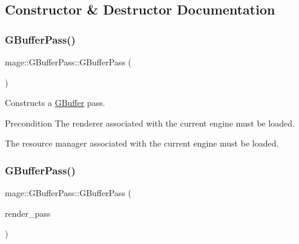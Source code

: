 \subsection{Constructor \& Destructor Documentation}
\hypertarget{classmage_1_1_g_buffer_pass_afe455d4051cddf84b7752b4bf4aa282f}{}\label{classmage_1_1_g_buffer_pass_afe455d4051cddf84b7752b4bf4aa282f} 
\subsubsection{\texorpdfstring{G\+Buffer\+Pass()}{GBufferPass()}\hspace{0.1cm}{\footnotesize\ttfamily [1/3]}}
{\footnotesize\ttfamily mage\+::\+G\+Buffer\+Pass\+::\+G\+Buffer\+Pass (\begin{DoxyParamCaption}{ }\end{DoxyParamCaption})}

Constructs a \hyperlink{structmage_1_1_g_buffer}{G\+Buffer} pass.

\begin{DoxyPrecond}{Precondition}
The renderer associated with the current engine must be loaded. 

The resource manager associated with the current engine must be loaded. 
\end{DoxyPrecond}
\hypertarget{classmage_1_1_g_buffer_pass_a3b9f59097aef9175f942c9c9424d0dab}{}\label{classmage_1_1_g_buffer_pass_a3b9f59097aef9175f942c9c9424d0dab} 
\subsubsection{\texorpdfstring{G\+Buffer\+Pass()}{GBufferPass()}\hspace{0.1cm}{\footnotesize\ttfamily [2/3]}}
{\footnotesize\ttfamily mage\+::\+G\+Buffer\+Pass\+::\+G\+Buffer\+Pass (\begin{DoxyParamCaption}\item[{const \hyperlink{classmage_1_1_g_buffer_pass}{G\+Buffer\+Pass} \&}]{render\+\_\+pass }\end{DoxyParamCaption})\hspace{0.3cm}{\ttfamily [delete]}}

